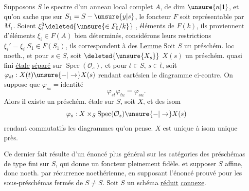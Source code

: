 Supposons $S$ le spectre d'un anneau local complet $A$,   de dim $\unsure{n|1}$, et qu'on sache que sur $S_1=S-\unsure{y|s}$, le foncteur $F$ soit représentable par $M_1$.  Soient $\xi_i^0\deleted{\unsure{\in F_0/k}}$ , éléments de $F(k)$, ils proviennent d'éléments $\xi_i\in F(A)$ bien déterminés, considérons leurs restrictions $\xi_i'=\xi_i|S_1\in F(S_1)$, ils correspondent à des
\uline{Lemme} Soit $S$ un préschém. loc noeth., et pour  $s\in S$, soit $\deleted{\unsure{X_s}}$ $X(s)$ un préschém. quasi fini \uline{étale} \uline{séparé} sur $\operatorname{Spec}(\mathcal O_s)$, et pour $t\in S$, $s\in\overline t$, soit $\varphi_{st}:X(t)\unsure{-|\to}X(s)$ rendant cartésien le diagramme ci-contre.
On suppose que $\varphi_{ss}=\text{identité}$
\[
\varphi_{st}\varphi_{tu}=\varphi_{su}.
\]
Alors il existe un préschém. étale  sur $S$, soit $X$, et des isom
\[
\varphi_s:X\times_S\operatorname{Spec}(\mathcal O_s)\unsure{-|\to}X(s)
\]
rendant commutatifs les diagrammes qu'on pense. $X$ est unique à isom unique près.

Ce dernier fait résulte d'un énoncé plus général sur les catégories des préschémas de type fini sur $S$, qui donne un foncteur pleinement fidèle.  et supposer $S$ affine, donc noeth.  par récurrence noethérienne, en supposant l'énoncé prouvé pour les sous-préschémas fermés de $S\ne S$.
Soit $S$ un schéma \uline{réduit} \uline{connexe}.


